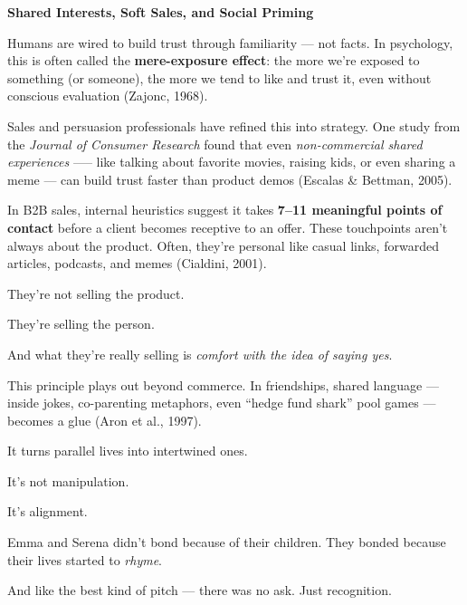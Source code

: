 \begin{PsychologicalSidebar}{\textbf{Shared Interests, Soft Sales, and Social Priming}}

    Humans are wired to build trust through familiarity — not facts.  
    In psychology, this is often called the \textbf{mere-exposure effect}: the more we're 
    exposed to something (or someone), the more we tend to like and trust it, even without 
    conscious evaluation (Zajonc, 1968).

    \medskip

    Sales and persuasion professionals have refined this into strategy.  
    One study from the \textit{Journal of Consumer Research} found that even \textit{non-commercial 
    shared experiences} —-- like talking about favorite movies, raising kids, or even sharing a 
    meme --- can build trust faster than product demos (Escalas \& Bettman, 2005).

    \medskip

    In B2B sales, internal heuristics suggest it takes \textbf{7–11 meaningful points of contact} 
    before a client becomes receptive to an offer. These touchpoints aren’t always about 
    the product. 
    Often, they’re personal like casual links, forwarded articles, podcasts, and memes (Cialdini, 2001).

    \medskip

    They’re not selling the product.

    \medskip

    They’re selling the person.

    \medskip

    And what they’re really selling is \textit{comfort with the idea of saying yes}.

    \medskip

    This principle plays out beyond commerce. In friendships, shared language — inside jokes, 
    co-parenting metaphors, even “hedge fund shark” pool games — becomes a glue (Aron et al., 1997).

    \medskip

    It turns parallel lives into intertwined ones.

    \medskip

    It’s not manipulation.

    \medskip

    It’s alignment.

    \medskip

    Emma and Serena didn’t bond because of their children.  
    They bonded because their lives started to \textit{rhyme}.

    \medskip

    And like the best kind of pitch — there was no ask.  
    Just recognition.

\end{PsychologicalSidebar}
